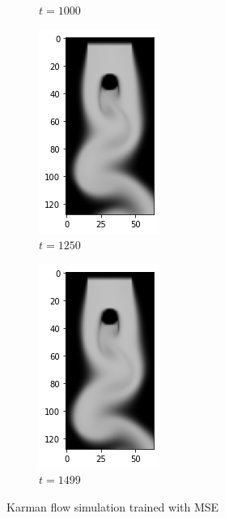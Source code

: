 \documentclass[a4paper,12pt,twoside]{report}
\begin{document}
\begin{figure}
\begin{subfigure}{0.18\textwidth}
		\caption{$t=1000$}
	\end{subfigure}
	\begin{subfigure}{0.18\textwidth}
		\centering
		\includegraphics[scale=0.5]{karmanflow/mse_density_001250.png}
		\caption{$t=1250$}
	\end{subfigure}
	\begin{subfigure}{0.18\textwidth}
		\centering
		\includegraphics[scale=0.5]{karmanflow/mse_density_001499.png}
		\caption{$t=1499$}
	\end{subfigure}
	\caption{Karman flow simulation trained with MSE}
\end{figure}
\end{document}
